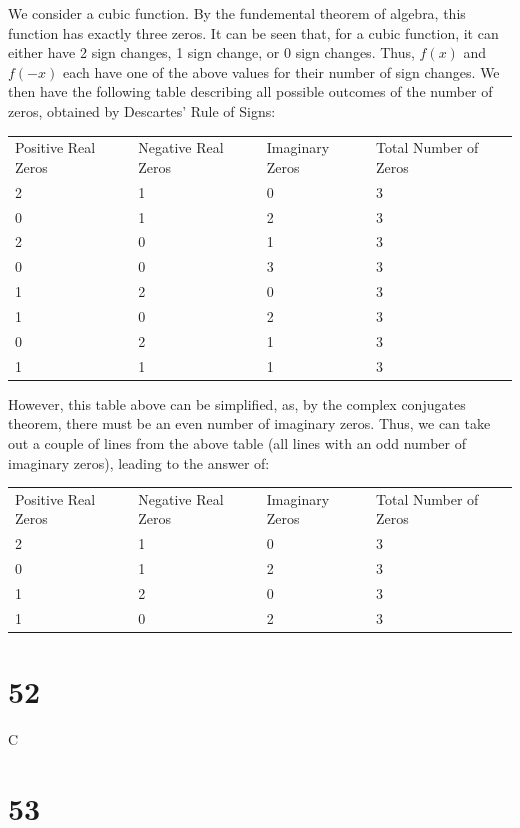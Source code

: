 \documentclass{article}
\theoremstyle{definition}
\begin{document}
We consider a cubic function. By the fundemental theorem of algebra, this function has exactly three zeros. It can be seen that, for 
a cubic function, it can either have 2 sign changes, 1 sign change, or 0 sign changes. Thus, $f(x)$ and $f(-x)$ each have one of the above 
values for their number of sign changes. We then have the following table describing all possible outcomes of the number of zeros, 
obtained by Descartes' Rule of Signs: 
\begin{center}
	\begin{tabular}{l|l|l|l}
		Positive Real Zeros & Negative Real Zeros & Imaginary Zeros & Total Number of Zeros \\
		2 & 1 & 0 & 3 \\
		0 & 1 & 2 & 3 \\
		2 & 0 & 1 & 3 \\
		0 & 0 & 3 & 3 \\
		1 & 2 & 0 & 3 \\
		1 & 0 & 2 & 3 \\
		0 & 2 & 1 & 3 \\
		1 & 1 & 1 & 3 
	\end{tabular}
\end{center}
However, this table above can be simplified, as, by the complex conjugates theorem, there must be an even number of imaginary zeros. Thus, we can take 
out a couple of lines from the above table (all lines with an odd number of imaginary zeros), leading to the answer of:
\begin{center}
        \begin{tabular}{l|l|l|l}
                Positive Real Zeros & Negative Real Zeros & Imaginary Zeros & Total Number of Zeros \\
                2 & 1 & 0 & 3 \\
                0 & 1 & 2 & 3 \\
                1 & 2 & 0 & 3 \\
                1 & 0 & 2 & 3 \\
        \end{tabular}
\end{center}

\section*{52}


C

\section*{53}
\end{document}
